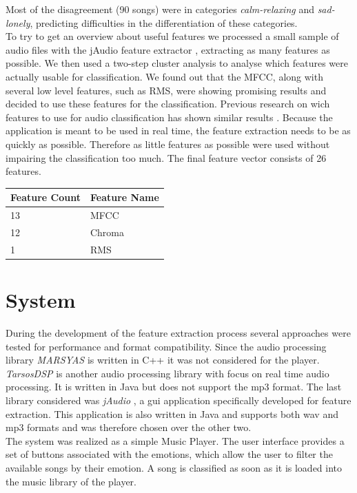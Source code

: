 \begin{multicols}{2}
Most of the disagreement (90 songs) were in categories \textit{calm-relaxing} and \textit{sad-lonely}, predicting difficulties in the differentiation of these categories.\\

To try to get an overview about useful features we processed a small sample of audio files with the jAudio feature extractor \citep{McEnnis2005}, extracting as many features as possible. We then used a two-step cluster analysis to analyse which features were actually usable for classification. We found out that the MFCC, along with several low level features, such as RMS, were showing promising results and decided to use these features for the classification. Previous research on wich features to use for audio classification has shown similar results \citep{Mckinney2003, Mandel2005, Tzanetakis2001}. Because the application is meant to be used in real time, the feature extraction needs to be as quickly as possible. Therefore as little features as possible were used without impairing the classification too much. The final feature vector consists of 26 features.

\begin{center}
\begin{tabular}{@{}ll@{}}
Feature Count & Feature Name \\ \midrule
13 & MFCC \\
12 & Chroma \\
1  & RMS
\end{tabular}
\end{center}

\section{System}
During the development of the feature extraction process several approaches were tested for performance and format compatibility. Since the audio processing library \textit{MARSYAS} \citep{Tzanetakis1999} is written in C++ it was not considered for the player. \textit{TarsosDSP} \citep{Six2014} is another audio processing library with focus on real time audio processing. It is written in Java but does not support the mp3 format. The last library considered was \textit{jAudio} \citep{McEnnis2005}, a gui application specifically developed for feature extraction. This application is also written in Java and supports both wav and mp3 formats and was therefore chosen over the other two.\\

The system was realized as a simple Music Player. The user interface provides a set of buttons associated with the emotions, which allow the user to filter the available songs by their emotion. A song is classified as soon as it is loaded into the music library of the player.


\end{multicols}
